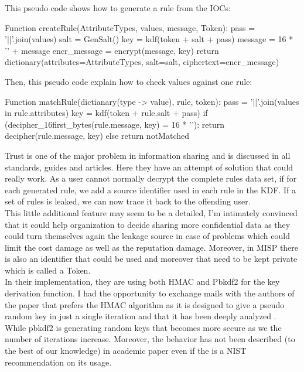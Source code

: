 \documentclass{eplmastersthesis}
\begin{document}
This pseudo code shows how to generate a rule from the IOCs:

\begin{center}
\begin{boxedverbatim}
Function createRule(AttributeTypes, values, message, Token):
        pass = '||'.join(values)
        salt = GenSalt()
        key = kdf(token + salt + pass)
        message = 16 * '' + message
        encr_message = encrypt(message, key)
        return dictionary(attributes=AttributeTypes, 
                            salt=salt,
                            ciphertext=encr_message)
\end{boxedverbatim}
\end{center}

Then, this pseudo code explain how to check values against one rule:
\begin{center}
\begin{boxedverbatim}
Function matchRule(dictianary(type -> value), rule, token):
        pass = '||'.join(values in rule.attributes)
        key = kdf(token + rule.salt + pass)
        if (decipher_16first_bytes(rule.message, key) = 16 * ''):
                return decipher(rule.message, key)
        else
                return notMatched
\end{boxedverbatim}
\end{center}


Trust is one of the major problem in information sharing and is discussed in all standards, guides and articles. Here they have an attempt of solution that could really work. As a user cannot normally decrypt the complete rules data set, if for each generated rule, we add a source identifier used in each rule in the KDF. If a set of rules is leaked, we can now trace it back to the offending user. \\
This little additional feature may seem to be a detailed, I'm intimately convinced that it could help organization to decide sharing more confidential data as they could turn themselves 
again the leakage source in case of problems which could limit the cost damage as well as the reputation damage. Moreover, in MISP there is also an identifier that could be used and moreover that need to be kept private which is called a Token.\\

In their implementation, they are using both HMAC and Pbkdf2 for the key derivation function. I had the opportunity to exchange mails with the authors of the paper that prefers the HMAC algorithm as it is designed to give a pseudo random key in just a single iteration and that it has been deeply analyzed \cite{cryptoeprint:2010:264}. While pbkdf2 is generating random keys that becomes more secure as we the number of iterations increase. Moreover, the behavior has not been described (to the best of our knowledge) in academic paper even if the is a NIST recommendation on its usage.\\
\end{document}
